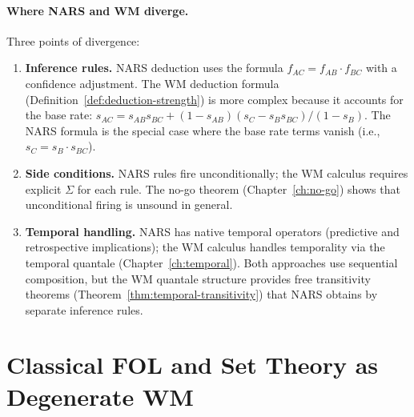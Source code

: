 \paragraph{Where NARS and WM diverge.}
Three points of divergence:
\begin{enumerate}
\item \textbf{Inference rules.}  NARS deduction uses the formula
  $f_{AC} = f_{AB} \cdot f_{BC}$ with a confidence adjustment.  The
  WM deduction formula (Definition~\ref{def:deduction-strength}) is
  more complex because it accounts for the base rate:
  $s_{AC} = s_{AB} s_{BC} + (1 - s_{AB})(s_C - s_B s_{BC})/(1 - s_B)$.
  The NARS formula is the special case where the base rate terms
  vanish (i.e., $s_C = s_B \cdot s_{BC}$).
\item \textbf{Side conditions.}  NARS rules fire unconditionally;
  the WM calculus requires explicit $\Sigma$ for each rule.  The
  no-go theorem (Chapter~\ref{ch:no-go}) shows that unconditional
  firing is unsound in general.
\item \textbf{Temporal handling.}  NARS has native temporal operators
  (predictive and retrospective implications); the WM calculus
  handles temporality via the temporal quantale
  (Chapter~\ref{ch:temporal}).  Both approaches use sequential
  composition, but the WM quantale structure provides free
  transitivity theorems (Theorem~\ref{thm:temporal-transitivity})
  that NARS obtains by separate inference rules.
\end{enumerate}



\section{Classical FOL and Set Theory as Degenerate WM}
\label{sec:bridge-fol}

